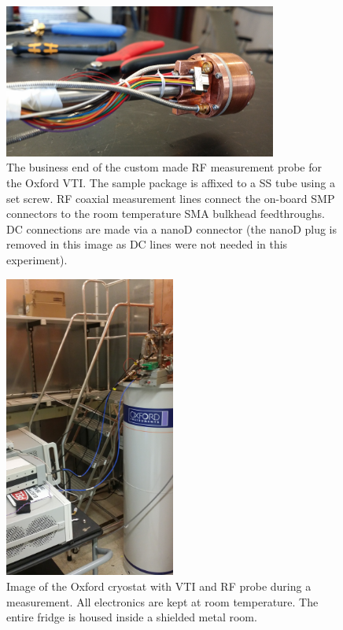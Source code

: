 \begin{figure}
\centering
\includegraphics[width = 0.8\textwidth]{figures/appendix/cryostats/Oxford_probe2.jpg}
\caption{The business end of the custom made RF measurement probe for the Oxford VTI. The sample package is affixed to a SS tube using a set screw. RF coaxial measurement lines connect the on-board SMP connectors to the room temperature SMA bulkhead feedthroughs. DC connections are made via a nanoD connector (the nanoD plug is removed in this image as DC lines were not needed in this experiment).}
\label{Fig:Appen:Oxford_Probe}
\end{figure}

\begin{figure}
\centering
\includegraphics[angle=-90, width = 0.5\textwidth]{figures/appendix/cryostats/Oxford.jpg}
\caption{Image of the Oxford cryostat with VTI and RF probe during a measurement. All electronics are kept at room temperature. The entire fridge is housed inside a shielded metal room.}
\label{Fig:Appen:Oxford}
\end{figure}

